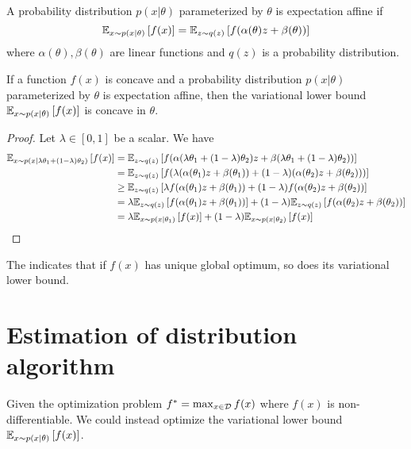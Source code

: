 \documentclass{article}
\begin{document}
\begin{definition}
    A probability distribution $p(x|\theta)$ parameterized by $\theta$ is expectation affine if
    \begin{equation}
        \Exp{f(x)}{x\sim p(x|\theta)} = \Exp{f(\alpha(\theta)z + \beta(\theta))}{z\sim q(z)}
    \end{equation}
    where $\alpha(\theta), \beta(\theta)$ are linear functions and $q(z)$ is a probability distribution. 
\end{definition}

\begin{theorem}\label{thm:concavebound}
    If a function $f(x)$ is concave and a probability distribution $p(x|\theta)$ parameterized by $\theta$ is expectation affine, then the variational lower bound $\Exp{f(x)}{x\sim p(x|\theta)}$ is concave in $\theta$. 
\end{theorem}
\begin{proof}
    Let $\lambda\in[0, 1]$ be a scalar. We have
    \begin{align*}
        \Exp{f(x)}{x\sim p(x|\lambda\theta_1 + (1-\lambda)\theta_2)}
        &= \Exp{f(\alpha(\lambda\theta_1 + (1-\lambda)\theta_2)z + \beta(\lambda\theta_1 + (1-\lambda)\theta_2))}{z\sim q(z)} \\
        &= \Exp{f(\lambda(\alpha(\theta_1)z + \beta(\theta_1)) + (1-\lambda)(\alpha(\theta_2)z + \beta(\theta_2)))}{z\sim q(z)} \\
        &\ge \Exp{\lambda f(\alpha(\theta_1)z + \beta(\theta_1)) + (1-\lambda) f(\alpha(\theta_2)z + \beta(\theta_2))}{z\sim q(z)} \\
        &= \lambda\Exp{f(\alpha(\theta_1)z + \beta(\theta_1))}{z\sim q(z)} + (1-\lambda)\Exp{f(\alpha(\theta_2)z + \beta(\theta_2))}{z\sim q(z)} \\
        &= \lambda\Exp{f(x)}{x\sim p(x|\theta_1)} + (1-\lambda)\Exp{f(x)}{x\sim p(x|\theta_2)}
    \end{align*}
\end{proof}
The  indicates that if $f(x)$ has unique global optimum, so does its variational lower bound. 

\section{Estimation of distribution algorithm}
Given the optimization problem $f^* = \max_{x\in\ccD}f(x)$ where $f(x)$ is non-differentiable. We could instead optimize the variational lower bound $\Exp{f(x)}{x\sim p(x|\theta)}$. 
\end{document}
